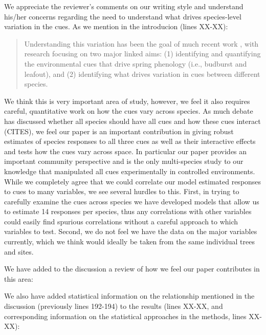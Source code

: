 \documentclass[11pt,a4paper]{article}
\begin{document}
We appreciate the reviewer's comments on our writing style and understand his/her concerns regarding the need to understand what drives species-level variation in the cues. As we mention in the introducion (lines XX-XX):

\begin{quote}
Understanding this variation has been the goal of much recent work \citep{Rutishauser:2008fu,Laube2015,donnelly2017,zohner2017}, with research focusing on two major linked aims: (1) identifying and quantifying the environmental cues that drive spring phenology (i.e., budburst and leafout), and (2) identifying what drives variation in cues between different species.
\end{quote}
We think this is very important area of study, however, we feel it also requires careful, quantitative work on how the cues vary across species. As much debate has discussed whether all species should have all cues and how these cues interact (CITES), we feel our paper is an important contribution in giving robust estimates of species responses to all three cues as well as their interactive effects and tests how the cues vary across space. In particular our paper provides an important community perspective and is the only multi-species study to our knowledge that manipulated all cues experimentally in controlled environments. While we completely agree that we could correlate our model estimated responses to cues to many variables, we see several hurdles to this. First, in trying to carefully examine the cues across species we have developed models that allow us to estimate 14 responses per species, thus any correlations with other variables could easily find spurious correlations without a careful approach to which variables to test. Second, we do not feel we have the data on the major variables currently, which we think would ideally be taken from the same individual trees and sites. 

We have added to the discussion a review of how we feel our paper contributes in this area:
\begin{quote}
\end{quote}

We also have added statistical information on the relationship mentioned in the discussion (previously lines 192-194) to the results (lines XX-XX, and corresponding information on the statistical approaches in the methods, lines XX-XX):
\begin{quote}
\end{quote}
\end{document}
